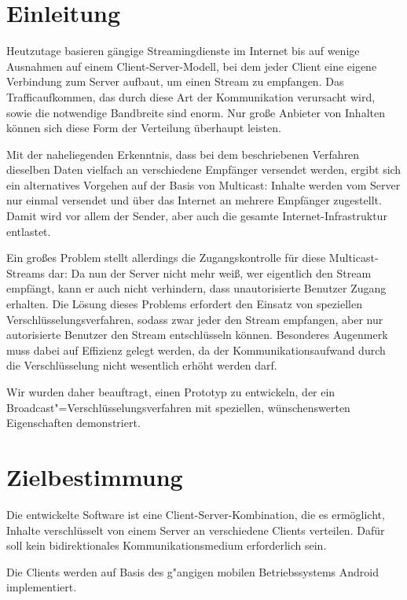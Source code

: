 \documentclass[a4paper,10pt]{scrartcl}
\title{\doctitle}
\author{\authorName}
\date{\today}
\begin{document}

\tableofcontents
\clearpage

\section{Einleitung}

Heutzutage basieren gängige Streamingdienste im Internet bis auf wenige Ausnahmen auf
einem Client-Server-Modell, bei dem jeder Client eine eigene Verbindung zum Server
aufbaut, um einen Stream zu empfangen. Das Trafficaufkommen, das durch diese Art der
Kommunikation verursacht wird, sowie die notwendige Bandbreite sind enorm. Nur große
Anbieter von Inhalten können sich diese Form der Verteilung überhaupt leisten.

Mit der naheliegenden Erkenntnis, dass bei dem beschriebenen Verfahren dieselben Daten
vielfach an verschiedene Empfänger versendet werden, ergibt sich ein alternatives
Vorgehen auf der Basis von Multicast: Inhalte werden vom Server nur einmal versendet
und über das Internet an mehrere Empfänger zugestellt. Damit wird vor allem der Sender,
aber auch die gesamte Internet-Infrastruktur entlastet.

Ein großes Problem stellt allerdings die Zugangskontrolle für diese Multicast-Streams
dar: Da nun der Server nicht mehr weiß, wer eigentlich den Stream empfängt, kann
er auch nicht verhindern, dass unautorisierte Benutzer Zugang erhalten. Die Lösung
dieses Problems erfordert den Einsatz von speziellen Verschlüsselungsverfahren,
sodass zwar jeder den Stream empfangen, aber nur autorisierte Benutzer den Stream
entschlüsseln können. Besonderes Augenmerk muss dabei auf Effizienz gelegt werden,
da der Kommunikationsaufwand durch die Verschlüsselung nicht wesentlich erhöht werden
darf.

Wir wurden daher beauftragt, einen Prototyp zu entwickeln, der ein
Broadcast"=Verschlüsselungsverfahren mit speziellen, wünschenswerten Eigenschaften
demonstriert.
\clearpage

\section{Zielbestimmung}

Die entwickelte Software ist eine Client-Server-Kombination, die es ermöglicht,
Inhalte verschlüsselt von einem Server an verschiedene Clients verteilen. Dafür
soll kein bidirektionales Kommunikationsmedium erforderlich sein.

Die Clients werden auf Basis des g"angigen mobilen Betriebssystems Android
implementiert.
\end{document}
